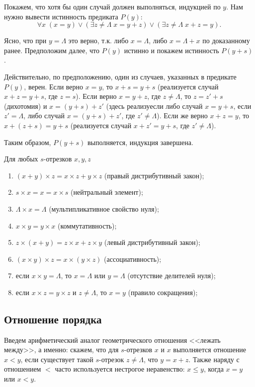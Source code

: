 Покажем, что хотя бы один случай должен выполняться, индукцией по $y$. Нам нужно вывести истинность предиката $P(y)$:
$$
\forall x\;(x=y)\lor(\exists z\ne\Lambda\;x=y+z)\lor(\exists z\ne\Lambda\;x+z=y).
$$

Ясно, что при $y=\Lambda$ это верно, т.к. либо $x=\Lambda$, либо $x=\Lambda+x$ по доказанному ранее. Предположим далее, что $P(y)$ истинно и покажем истинность $P(y+s)$.

Действительно, по предположению, один из случаев, указанных в предикате $P(y)$, верен. Если верно $x=y$, то $x+s=y+s$ (реализуется случай $x+z=y+s$, где $z=s$). Если верно $x=y+z$, где $z\ne\Lambda$, то $z=z'+s$ (дихотомия) и $x=(y+s)+z'$ (здесь реализуесли либо случай $x=y+s$, если $z'=\Lambda$, либо случай $x=(y+s)+z'$, где $z'\ne\Lambda$).
Если же верно $x+z=y$, то $x+(z+s)=y+s$ (реализуется случай $x+z'=y+s$, где $z'\ne\Lambda$).

Таким образом, $P(y+s)$ выполняется, индукция завершена.
\epf

\begin{thrm}\label{Production} Для любых $s$-отрезков $x,y,z$
\begin{enumerate}[P1]
\item $(x+y)\times z=x\times z+y\times z$ (правый дистрибутивный закон);
\item $s\times x=x=x\times s$ (нейтральный элемент);
\item $\Lambda\times x=\Lambda$ (мультипликативное свойство нуля);
\item $x\times y=y\times x$ (коммутативность);
\item $z\times (x+y)=z\times x+z\times y$ (левый дистрибутивный закон);
\item $(x\times y)\times z=x\times(y\times z)$ (ассоциативность);
\item если $x\times y=\Lambda$, то $x=\Lambda$ или $y=\Lambda$ (отсутствие делителей нуля);
\item если $x\times z=y\times z$ и $z\ne\Lambda$, то $x=y$ (правило сокращения);
\end{enumerate}
\end{thrm}


\subsection{Отношение порядка}

Введем арифметический аналог геометрического отношения <<лежать между>>, а именно: скажем, что для $s$-отрезков $x$ и $x$ выполняется отношение $x<y$, если существует такой $s$-отрезок $z\ne\Lambda$, что $y=x+z$. Также наряду с отношением $<$ часто используется нестрогое неравенство: $x\le y$, когда $x=y$ или $x<y$.

